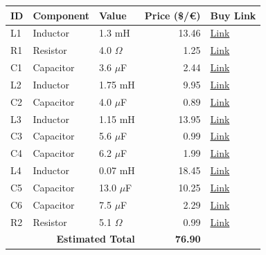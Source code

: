 \documentclass[11pt,a4paper]{report}
\begin{document}
\vspace{0.5cm}
\begin{table}[H]
    \centering
    \renewcommand{\arraystretch}{1.5}
    \begin{tabular}{@{}lllrl@{}}
        \toprule
        \textbf{ID} & \textbf{Component} & \textbf{Value} & \textbf{Price (\$/€)} & \textbf{Buy Link} \\
        \midrule
        L1 & Inductor & 1.3 mH & 13.46 & \href{https://www.soundimports.eu/en/jantzen-audio-000-5005.html}{Link} \\
        R1 & Resistor & 4.0 $\Omega$ & 1.25 & \href{https://www.parts-express.com/Dayton-Audio-DNR-4.0-4-Ohm-10W-Precision-Audio-Grade-Resisto-004-4}{Link} \\
        C1 & Capacitor & 3.6 $\mu$F & 2.44 & \href{https://www.soundimports.eu/en/jantzen-audio-001-0244.html}{Link} \\
        L2 & Inductor & 1.75 mH & 9.95 & \href{https://www.soundimports.eu/en/jantzen-audio-000-5586.html}{Link} \\
        C2 & Capacitor & 4.0 $\mu$F & 0.89 & \href{https://www.parts-express.com/4.0uF-100V-Non-Polarized-Capacitor-027-330}{Link} \\
        L3 & Inductor & 1.15 mH & 13.95 & \href{https://www.soundimports.eu/en/jantzen-audio-000-1625.html}{Link} \\
        C3 & Capacitor & 5.6 $\mu$F & 0.99 & \href{https://www.parts-express.com/5.6uF-100V-Non-Polarized-Capacitor-027-334}{Link} \\
        C4 & Capacitor & 6.2 $\mu$F & 1.99 & \href{https://www.parts-express.com/Dayton-Audio-PMPC-6.2-6.2uF-250V-Precision-Audio-Capacitor-027-236}{Link} \\
        L4 & Inductor & 0.07 mH & 18.45 & \href{https://www.soundimports.eu/en/jantzen-audio-000-7615.html}{Link} \\
        C5 & Capacitor & 13.0 $\mu$F & 10.25 & \href{https://www.soundimports.eu/en/audyn-q4-13-0-400.html}{Link} \\
        C6 & Capacitor & 7.5 $\mu$F & 2.29 & \href{https://www.parts-express.com/Solen-7.5uF-400V-Polypropylene-Capacitor-027-562}{Link} \\
        R2 & Resistor & 5.1 $\Omega$ & 0.99 & \href{https://www.soundimports.eu/en/jantzen-audio-002-0781.html}{Link} \\
        \midrule
        \multicolumn{3}{r}{\textbf{Estimated Total}} & \textbf{76.90} & \\
        \bottomrule
    \end{tabular}
\end{table}
\end{document}
